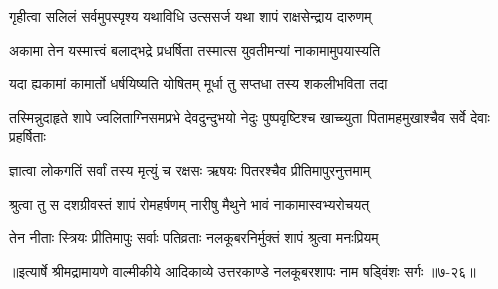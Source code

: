 \twolineshloka
{गृहीत्वा सलिलं सर्वमुपस्पृश्य यथाविधि}
{उत्ससर्ज यथा शापं राक्षसेन्द्राय दारुणम्} %

\twolineshloka
{अकामा तेन यस्मात्त्वं बलाद्भद्रे प्रधर्षिता}
{तस्मात्स युवतीमन्यां नाकामामुपयास्यति} %

\twolineshloka
{यदा ह्यकामां कामार्तो धर्षयिष्यति योषितम्}
{मूर्धा तु सप्तधा तस्य शकलीभविता तदा} %

\threelineshloka
{तस्मिन्नुदाहृते शापे ज्वलिताग्निसमप्रभे}
{देवदुन्दुभयो नेदुः पुष्पवृष्टिश्च खाच्च्युता}
{पितामहमुखाश्चैव सर्वे देवाः प्रहर्षिताः} %

\twolineshloka
{ज्ञात्वा लोकगतिं सर्वां तस्य मृत्युं च रक्षसः}
{ऋषयः पितरश्चैव प्रीतिमापुरनुत्तमाम्} %

\twolineshloka
{श्रुत्वा तु स दशग्रीवस्तं शापं रोमहर्षणम्}
{नारीषु मैथुने भावं नाकामास्वभ्यरोचयत्} %

\twolineshloka
{तेन नीताः स्त्रियः प्रीतिमापुः सर्वाः पतिव्रताः}
{नलकूबरनिर्मुक्तं शापं श्रुत्वा मनःप्रियम्} %


॥इत्यार्षे श्रीमद्रामायणे वाल्मीकीये आदिकाव्ये उत्तरकाण्डे नलकूबरशापः नाम षड्विंशः सर्गः ॥७-२६॥

